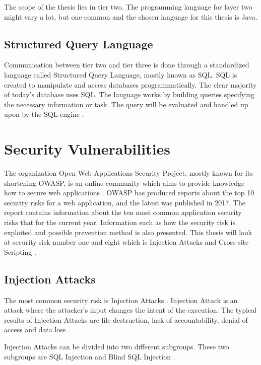 The scope of the thesis lies in tier two. The programming language for layer two might vary a lot, but one common and the chosen language for this thesis is Java.


\subsection{Structured Query Language}
Communication between tier two and tier three is done through a standardized language called Structured Query Language, mostly known as SQL. SQL is created to manipulate and access databases programmatically. The clear majority of today's database uses SQL. The language works by building queries specifying the necessary information or task. The query will be evaluated and handled up upon by the SQL engine \parencite{DarieCristian2003TPGt}.



\section{Security Vulnerabilities}
\label{SecurityVulnerabilities}
The organization Open Web Applications Security Project, mostly known for its shortening OWASP, is an online community which aims to provide knowledge how to secure web applications \parencite{OpenWebApplicationSecurityProject}. OWASP has produced reports about the top 10 security risks for a web application, and the latest was published in 2017. The report contains information about the ten most common application security risks that for the current year. Information such as how the security risk is exploited and possible prevention method is also presented. This thesis will look at security risk number one and eight which is Injection Attacks and Cross-site Scripting \parencite{OWASP2017}.



\subsection{Injection Attacks}
The most common security risk is Injection Attacks \parencite{OWASP2017}. Injection Attack is an attack where the attacker's input changes the intent of the execution. The typical results of Injection Attacks are file destruction, lack of accountability, denial of access and data loss \parencite{Secure_Web}.

Injection Attacks can be divided into two different subgroups. These two subgroups are SQL Injection and Blind SQL Injection \parencite{Secure_Web}.



